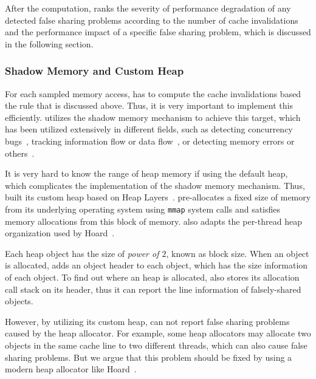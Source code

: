       
After the computation, 
\cheetah{} ranks the severity of performance degradation of any detected false sharing problems according to the number of cache invalidations and the performance impact of a specific false sharing problem, which is discussed in the following section.  


\subsubsection{Shadow Memory and Custom Heap}

For each sampled memory access, \cheetah{} has to compute the cache invalidations based the rule that is discussed above. Thus, it is very important to implement this efficiently. \Cheetah{} utilizes the shadow memory mechanism to achieve this target, which has been utilized extensively in different fields, such as detecting concurrency bugs~\cite{Harrow:2000:RCM:645880.672080, helgrind, 404681, Savage:1997:EDD:268998.266641}, tracking information flow or data flow~\cite{Cheng:2006:TEF:1157733.1157903, Newsome05dynamictaint, Qin:2006:LLP:1194816.1194834}, or detecting memory errors or others~\cite{qinzhao, Hastings91purify:fast, Seward:2005:UVD:1247360.1247362, Narayanasamy:2006:ALO:1140277.1140303}. 

It is very hard to know the range of heap memory if using the default heap, which complicates the implementation of the shadow memory mechanism. Thus, \cheetah{} built its custom heap based on Heap Layers~\cite{heaplayers}. \cheetah{} pre-allocates a fixed size of memory
from its underlying operating system using \texttt{mmap} system calls and satisfies memory allocations from this block of memory. \cheetah{} also adapts the per-thread heap organization used by Hoard~\cite{Hoard}. 

Each heap object has the size of {\it power of $2$}, known as block size. When an object is allocated, \cheetah{} adds an object header to each object, which has the size information of each object. To find out where an heap is allocated, \cheetah{} also stores its allocation call stack on its header, thus it can report the line information of falsely-shared objects. 

However, by utilizing its custom heap, \cheetah{} can not report false sharing problems caused by the heap allocator. For example, some heap allocators may allocate two objects in the same cache line to two different threads, which can also cause false sharing problems. But we argue that this problem should be fixed by using a modern heap allocator like Hoard~\cite{Hoard}.  

